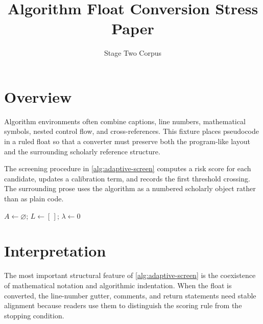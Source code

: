 \documentclass[11pt]{article}
\title{Algorithm Float Conversion Stress Paper}
\author{Stage Two Corpus}
\date{}
\begin{document}
\maketitle

\section{Overview}

Algorithm environments often combine captions, line numbers, mathematical symbols, nested control flow, and cross-references. This fixture places pseudocode in a ruled float so that a converter must preserve both the program-like layout and the surrounding scholarly reference structure.

The screening procedure in \cref{alg:adaptive-screen} computes a risk score for each candidate, updates a calibration term, and records the first threshold crossing. The surrounding prose uses the algorithm as a numbered scholarly object rather than as plain code.

\begin{algorithm}[tbp]
\DontPrintSemicolon
\caption{Adaptive screen with calibrated stopping}
\label{alg:adaptive-screen}
$A \leftarrow \varnothing$; $L \leftarrow [\,]$; $\lambda \leftarrow 0$\;
\;
\end{algorithm}

\section{Interpretation}

The most important structural feature of \cref{alg:adaptive-screen} is the coexistence of mathematical notation and algorithmic indentation. When the float is converted, the line-number gutter, comments, and return statements need stable alignment because readers use them to distinguish the scoring rule from the stopping condition.
\end{document}
